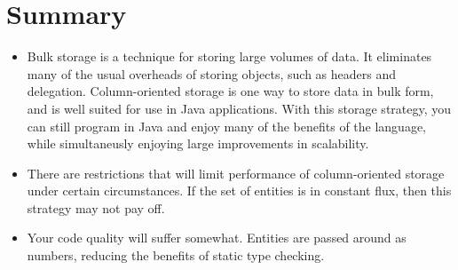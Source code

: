  

\section{Summary}

\begin{itemize}
  \item Bulk storage is a technique for storing large volumes of data. It
  eliminates many of the usual overheads of storing objects, such as headers and
  delegation. Column-oriented storage is one way to store data in bulk form,
  and is well suited for use in Java applications. With this storage
  strategy, you can still program in Java and enjoy many of the benefits of the
  language, while simultaneusly enjoying large improvements in scalability.
  \item There are restrictions that will limit performance of column-oriented
  storage under certain circumstances. If the set of entities is in constant
  flux, then this strategy may not pay off.
  \item Your code quality will suffer somewhat. Entities are passed around as
  numbers, reducing the benefits of static type checking.
\end{itemize}



